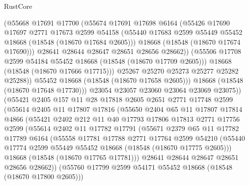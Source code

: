 \begin{lexlean}{RustCore}
\begin{coremodule}
                  (@55668
                    @17691
                    @17700
                    (@55674
                      @17691
                      @17698
                      @6164
                      (@55426
                        @17690
                        @17697
                        @2771
                        @17673
                        @2599
                        @54158
                        (@55440 @17683 @2599 @55449 @55452 @18668 (@18548 (@18670 @17684 @2605)))
                        @18668
                        (@18548 (@18670 @17674 @17690)))
                      @28641
                      @28644
                      @28647
                      @28651
                      @28656
                      @28662))
                  (@55506 @17708 @2599 @54184 @55452 @18668 (@18548 (@18670 @17709 @2605)))
                  @18668
                  (@18548 (@18670 @17666 @17715)))
                @25267
                @25270
                @25273
                @25277
                @25282
                @25288))
            @55452
            @18668
            (@18548 (@18670 @17658 @2605)))
          @18668
          (@18548 (@18670 @17648 @17730)))
        @23054
        @23057
        @23060
        @23064
        @23069
        @23075))
    (@55421
      @2405
      @157
      @11
      @28
      @17818
      @2605
      @2651
      @2771
      @17748
      @2599
      (@55614
        @2405
        @11
        @17807
        @17816
        (@55650
          @2404
          @65
          @11
          @17807
          @17814
          @4866
          (@55421
            @2402
            @212
            @11
            @40
            @17793
            @17806
            @17813
            @2771
            @17756
            @2599
            (@55614
              @2402
              @11
              @17782
              @17791
              (@55671
                @2379
                @65
                @11
                @17782
                @17789
                @6164
                (@55558
                  @17781
                  @17788
                  @2771
                  @17764
                  @2599
                  @54210
                  (@55440 @17774 @2599 @55449 @55452 @18668 (@18548 (@18670 @17775 @2605)))
                  @18668
                  (@18548 (@18670 @17765 @17781)))
                @28641
                @28644
                @28647
                @28651
                @28656
                @28662))
            (@55760 @17799 @2599 @54171 @55452 @18668 (@18548 (@18670 @17800 @2605)))

\end{coremodule}
\end{lexlean}
